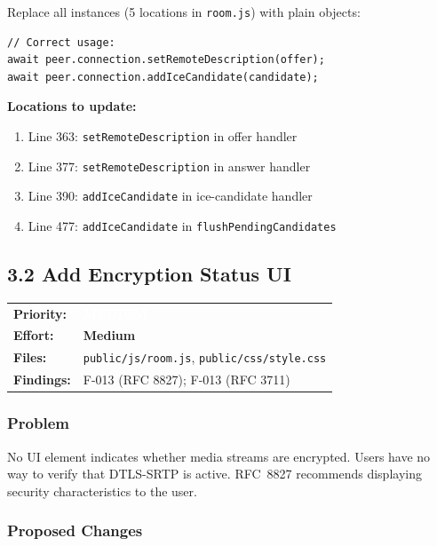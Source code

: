 \documentclass[11pt,letterpaper]{article}
\newcommand{\primedium}{\colorbox{minor!80!black}{\textcolor{white}{\small\textbf{MEDIUM}}}}
\newcommand{\effmedium}{\colorbox{partial!30}{\small\textbf{Medium}}}
\begin{document}
Replace all instances (5 locations in \texttt{room.js}) with plain objects:

\begin{verbatim}
// Correct usage:
await peer.connection.setRemoteDescription(offer);
await peer.connection.addIceCandidate(candidate);
\end{verbatim}

\textbf{Locations to update:}
\begin{enumerate}[leftmargin=2em]
    \item Line 363: \texttt{setRemoteDescription} in offer handler
    \item Line 377: \texttt{setRemoteDescription} in answer handler
    \item Line 390: \texttt{addIceCandidate} in ice-candidate handler
    \item Line 477: \texttt{addIceCandidate} in \texttt{flushPendingCandidates}
\end{enumerate}

\newpage

\subsection{3.2 Add Encryption Status UI}

\begin{tabular}{ll}
\textbf{Priority:} & \primedium \\
\textbf{Effort:} & \effmedium \\
\textbf{Files:} & \texttt{public/js/room.js}, \texttt{public/css/style.css} \\
\textbf{Findings:} & F-013 (RFC 8827); F-013 (RFC 3711) \\
\end{tabular}

\subsubsection{Problem}

No UI element indicates whether media streams are encrypted. Users have no way to verify that DTLS-SRTP is active. RFC~8827 recommends displaying security characteristics to the user.

\subsubsection{Proposed Changes}
\end{document}
